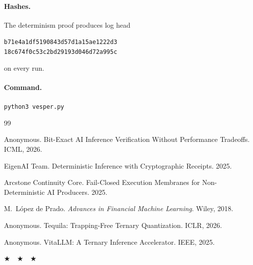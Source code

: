 \documentclass[11pt,a4paper]{article}
\newcommand{\gld}[1]{\textcolor{goldshiny}{#1}}
\newcommand{\cel}[1]{\textcolor{celadon}{#1}}
\newcommand{\sparkle}{{\color{goldshiny}$\bigstar$}}
\theoremstyle{definition}
\begin{document}
\paragraph{Hashes.} The determinism proof produces log head
\begin{center}
\cel{\texttt{b71e4a1df5190843d57d1a15ae1222d3}}\\
\cel{\texttt{18c674f0c53c2bd29193d046d72a995c}}
\end{center}
on every run.

\paragraph{Command.} \texttt{python3 vesper.py}

\begin{thebibliography}{99}

Anonymous. Bit-Exact AI Inference Verification Without Performance Tradeoffs. ICML, 2026.

EigenAI Team. Deterministic Inference with Cryptographic Receipts. 2025.

Arcstone Continuity Core. Fail-Closed Execution Membranes for Non-Deterministic AI Producers. 2025.

M.~L\'opez de Prado. \emph{Advances in Financial Machine Learning}. Wiley, 2018.

Anonymous. Tequila: Trapping-Free Ternary Quantization. ICLR, 2026.

Anonymous. VitaLLM: A Ternary Inference Accelerator. IEEE, 2025.

\end{thebibliography}

\vspace{1cm}

\begin{center}
\gld{\sparkle\ \ \sparkle\ \ \sparkle}
\end{center}
\end{document}
